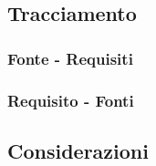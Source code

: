 \subsection{Tracciamento}
\subsubsection{Fonte - Requisiti}
\subsubsection{Requisito - Fonti}
\subsection{Considerazioni}




